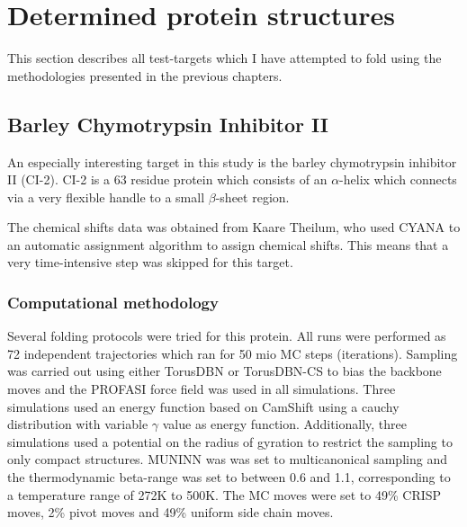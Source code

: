 \chapter{Determined protein structures}
This section describes all test-targets which I have attempted to fold using the methodologies presented in the previous chapters.

\section{Barley Chymotrypsin Inhibitor II}

An especially interesting target in this study is the barley chymotrypsin inhibitor II (CI-2). CI-2 is a 63 residue protein which consists of an $\alpha$-helix which connects via a very flexible handle to a small $\beta$-sheet region.

The chemical shifts data was obtained from Kaare Theilum, who used CYANA to an automatic assignment algorithm to assign chemical shifts. This means that a very time-intensive step was skipped for this target. 
\subsection{Computational methodology}
Several folding protocols were tried for this protein. All runs were performed as 72 independent trajectories which ran for 50 mio MC steps (iterations). Sampling was carried out using either TorusDBN or TorusDBN-CS to bias the backbone moves and the PROFASI force field was used in all simulations. Three simulations used an energy function based on CamShift using a cauchy distribution with variable $\gamma$ value as energy function. Additionally, three simulations used a potential on the radius of gyration to restrict the sampling to only compact structures. MUNINN was was set to multicanonical sampling and the thermodynamic beta-range was set to between 0.6 and 1.1, corresponding to a temperature range of 272K to 500K. The MC moves were set to 49\% CRISP moves, 2\% pivot moves and 49\% uniform side chain moves.


